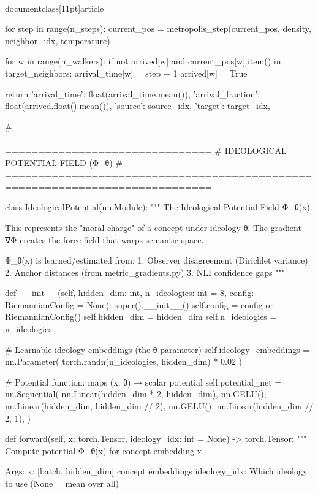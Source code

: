 \\documentclass[11pt]{article}
\begin{document}
\begin{CodeBlock}
    for step in range(n_steps):
        current_pos = metropolis_step(current_pos, density, neighbor_idx, temperature)

        for w in range(n_walkers):
            if not arrived[w] and current_pos[w].item() in target_neighbors:
                arrival_time[w] = step + 1
                arrived[w] = True

    return {
        'arrival_time': float(arrival_time.mean()),
        'arrival_fraction': float(arrived.float().mean()),
        'source': source_idx,
        'target': target_idx,
    }


# =============================================================================
# IDEOLOGICAL POTENTIAL FIELD (Φ_θ)
# =============================================================================

class IdeologicalPotential(nn.Module):
    """
    The Ideological Potential Field Φ_θ(x).

    This represents the "moral charge" of a concept under ideology θ.
    The gradient ∇Φ creates the force field that warps semantic space.

    Φ_θ(x) is learned/estimated from:
    1. Observer disagreement (Dirichlet variance)
    2. Anchor distances (from metric_gradients.py)
    3. NLI confidence gaps
    """

    def __init__(self, hidden_dim: int, n_ideologies: int = 8, config: RiemannianConfig = None):
        super().__init__()
        self.config = config or RiemannianConfig()
        self.hidden_dim = hidden_dim
        self.n_ideologies = n_ideologies

        # Learnable ideology embeddings (the θ parameter)
        self.ideology_embeddings = nn.Parameter(
            torch.randn(n_ideologies, hidden_dim) * 0.02
        )

        # Potential function: maps (x, θ) → scalar potential
        self.potential_net = nn.Sequential(
            nn.Linear(hidden_dim * 2, hidden_dim),
            nn.GELU(),
            nn.Linear(hidden_dim, hidden_dim // 2),
            nn.GELU(),
            nn.Linear(hidden_dim // 2, 1),
        )

    def forward(self, x: torch.Tensor, ideology_idx: int = None) -> torch.Tensor:
        """
        Compute potential Φ_θ(x) for concept embedding x.

        Args:
            x: [batch, hidden_dim] concept embeddings
            ideology_idx: Which ideology to use (None = mean over all)


\end{CodeBlock}
\end{document}
